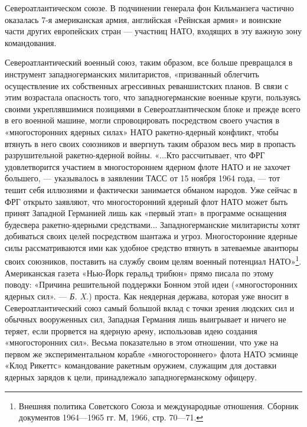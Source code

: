 \documentclass[12pt, a4paper, openany]{book}
\begin{document}
Североатлантическом союзе. В подчинении генерала фон Кильманзега частично оказалась 7-я американская армия, английская «Рейнская армия» и воинские части других европейских стран — участниц НАТО, входящих в эту важную зону командования.
	
	Североатлантический военный союз, таким образом, все больше превращался в инструмент западногерманских  милитаристов, «призванный облегчить осуществление их  собственных агрессивных реваншистских планов. В связи с этим  возрастала опасность того, что западногерманские военные круги, пользуясь своими укреплявшимися позициями в Североатлантическом блоке и прежде всего в его военной машине, могли спровоцировать посредством своего участия в «многосторонних ядерных силах» НАТО ракетно-ядерный  конфликт, чтобы втянуть в него своих союзников и ввергнуть  таким образом весь мир в пропасть разрушительной ракетно-ядерной войны. «...Кто рассчитывает, что ФРГ удовлетворится участием в многостороннем ядерном флоте НАТО и не захочет большего, — указывалось в заявлении ТАСС от 15 ноября 1964 года, — тот тешит себя иллюзиями и фактически  занимается обманом народов. Уже сейчас в ФРГ открыто заявляют, что многосторонний ядерный флот НАТО может быть принят Западной Германией лишь как «первый этап» в программе  оснащения будесвера ракетно-ядерными средствами...  Западногерманские милитаристы хотят добиваться своих целей  посредством шантажа и угроз. Многосторонние ядерные силы рассматриваются ими как удобное средство втянуть в  затеваемые авантюры своих союзников, поставить на службу своим целям военный потенциал НАТО»{\footnote{Внешняя политика Советского Союза и международные отношения. Сборник документов 1964—1965 гг. М, 1966, стр. 70—71.}}. Американская газета «Нью-Йорк геральд трибюн» прямо писала по этому поводу: «Причина решительной поддержки Бонном этой идеи  («многосторонних ядерных сил». — \textit{Б. X.}) проста. Как неядерная  держава, которая уже вносит в Североатлантический союз самый большой вклад с точки зрения людских сил и обычных  вооруженных сил, Западная Германия лишь выигрывает и ничего не теряет, если прорвется на ядерную арену, использовав идею создания «многосторонних сил». Весьма показательно в этом отношении, что уже на первом же экспериментальном корабле «многостороннего» флота НАТО эсминце «Клод Рикеттс»  командование ракетным оружием, служащим для доставки  ядерных зарядов к цели, принадлежало западногерманскому  офицеру.
	
	
	
\end{document}
